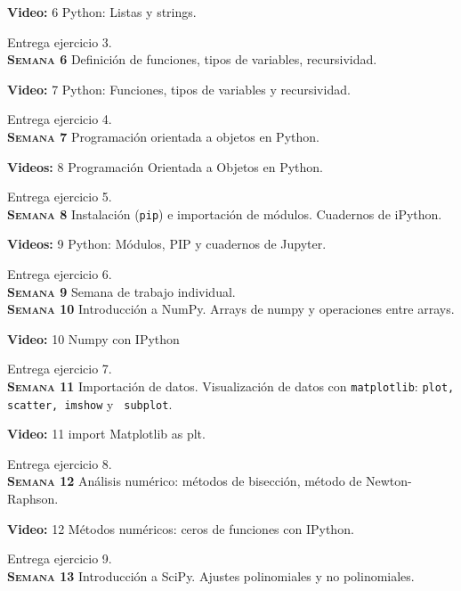 \documentclass[letterpaper,10pt,onecolumn]{article}
\begin{document}
\textbf{Video:} 6  Python: Listas y strings.

Entrega ejercicio 3.
\\[-0.3cm] 

\noindent\textbf{\textsc{Semana 6}} Definición de funciones,
tipos de variables, recursividad. 

\textbf{Video:} 7 Python: Funciones, tipos de variables y recursividad.

Entrega ejercicio 4.
\\[-0.3cm] 

\noindent\textbf{\textsc{Semana 7}} Programaci\'on orientada a objetos en Python. 

\textbf{Videos:} 8 Programación Orientada a Objetos en Python.

Entrega ejercicio 5.
\\[-0.3cm]  

\noindent\textbf{\textsc{Semana 8}} Instalación (\verb+pip+) e importación de módulos. Cuadernos de iPython.

\textbf{Videos:} 9 Python: Módulos, PIP y cuadernos de Jupyter.

Entrega ejercicio 6.
\\[-0.3cm]  


\noindent\textbf{\textsc{Semana 9}}  Semana de trabajo individual.
\\[-0.3cm]  

\noindent\textbf{\textsc{Semana 10}} Introducción a NumPy. Arrays de numpy y operaciones entre arrays. 

\textbf{Video:} 10 Numpy con IPython

Entrega ejercicio 7.
\\[-0.3cm]  


\noindent\textbf{\textsc{Semana 11}}  Importación de datos. Visualización de datos con
\verb+matplotlib+: \verb+plot, scatter, imshow+ y  \verb+ subplot+.

\textbf{Video:} 11 import Matplotlib as plt.

Entrega ejercicio 8.
\\[-0.3cm]  

\noindent\textbf{\textsc{Semana 12}} Análisis numérico: métodos de bisección, método de Newton-Raphson. 

\textbf{Video:} 12 Métodos numéricos: ceros de funciones con IPython.

Entrega ejercicio 9.
\\[-0.3cm]  

\noindent\textbf{\textsc{Semana 13}} Introducción a
SciPy. Ajustes polinomiales y no polinomiales.
\end{document}
